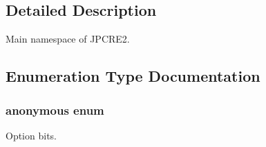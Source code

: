 \subsection{Detailed Description}
Main namespace of J\+P\+C\+R\+E2. 

\subsection{Enumeration Type Documentation}
\subsubsection[{\texorpdfstring{anonymous enum}{anonymous enum}}]{\setlength{\rightskip}{0pt plus 5cm}anonymous enum}\hypertarget{namespacejpcre2_a85c143271501e383843f45b9999c2f00}{}\label{namespacejpcre2_a85c143271501e383843f45b9999c2f00}


Option bits. 

